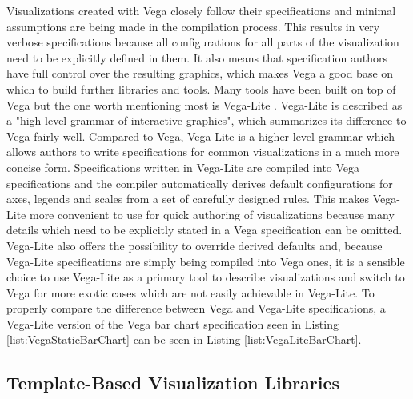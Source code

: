 Visualizations created with Vega closely follow their specifications and minimal assumptions are being made in the compilation process.
This results in very verbose specifications because all configurations for all parts of the visualization need to be explicitly defined in them.
It also means that specification authors have full control over the resulting graphics, which makes Vega a good base on which to build further libraries and tools.
Many tools \parencite{Voyager,Lyra,CompassQL} have been built on top of Vega but the one worth mentioning most is Vega-Lite \parencite{VegaLite}.
Vega-Lite is described as a "high-level grammar of interactive graphics", which summarizes its difference to Vega fairly well.
Compared to Vega, Vega-Lite is a higher-level grammar which allows authors to write specifications for common visualizations in a much more concise form.
Specifications written in Vega-Lite are compiled into Vega specifications and the compiler automatically derives default configurations for axes, legends and scales from a set of carefully designed rules.
This makes Vega-Lite more convenient to use for quick authoring of visualizations because many details which need to be explicitly stated in a Vega specification can be omitted.
Vega-Lite also offers the possibility to override derived defaults and, because Vega-Lite specifications are simply being compiled into Vega ones, it is a sensible choice to use Vega-Lite as a primary tool to describe visualizations and switch to Vega for more exotic cases which are not easily achievable in Vega-Lite.
To properly compare the difference between Vega and Vega-Lite specifications, a Vega-Lite version of the Vega bar chart specification seen in Listing \ref{list:VegaStaticBarChart} can be seen in Listing \ref{list:VegaLiteBarChart}.

\begin{samepage}
 
    This is a Vega-Lite specification of the Vega bar chart specification seen in Listing \ref{list:VegaStaticBarChart} combined with Listing \ref{list:VegaBarChart}.
  },
]{listings/vega-lite-bar-chart.json}
\end{samepage}

\subsection{Template-Based Visualization Libraries}

